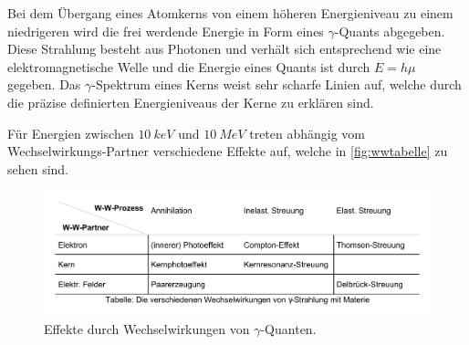 Bei dem Übergang eines Atomkerns von einem höheren Energieniveau zu einem niedrigeren
wird die frei werdende Energie in Form eines $\gamma$-Quants abgegeben. 
Diese Strahlung besteht aus Photonen und verhält sich entsprechend wie eine elektromagnetische Welle 
und die Energie eines Quants ist durch $E = h \mu$ gegeben. 
Das $\gamma$-Spektrum eines Kerns weist sehr scharfe Linien auf,
welche durch die präzise definierten Energieniveaus der Kerne zu erklären sind.

Für Energien zwischen $\qty{10}{keV}$ und $\qty{10}{MeV}$ treten abhängig vom Wechselwirkungs-Partner
verschiedene Effekte auf, welche in \autoref{fig:wwtabelle} zu sehen sind.
\begin{figure}
    \centering
    \includegraphics[width=\linewidth]{pictures/wwtabelle.pdf}
    \caption{Effekte durch Wechselwirkungen von $\gamma$-Quanten. \cite{v704}}
    \label{fig:wwtabelle}
\end{figure}